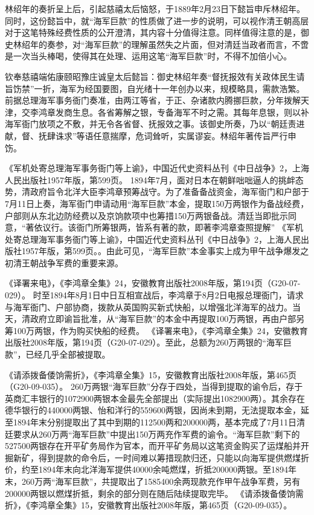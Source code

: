 \documentclass[12pt,UTF8]{ctexbook}
\begin{document}
林绍年的奏折呈上后，引起慈禧太后恼怒，于1889年2月23日下懿旨申斥林绍年。同时，这份懿旨中，就“海军巨款”的性质做了进一步的说明，可以视作清王朝高层对于这笔特殊经费性质的公开澄清，其内容十分值得注意。同样值得注意的是，御史林绍年的奏参，对“海军巨款”的理解虽然失之片面，但对清廷当政者而言，不啻是一次当头棒喝，使得其在处理、运用这笔“海军巨款”时，不得不加倍小心。

钦奉慈禧端佑康颐昭豫庄诚皇太后懿旨：御史林绍年奏“督抚报效有关政体民生请旨饬禁”一折，海军为经国要图，自光绪十一年创办以来，规模略具，需款浩繁。前据总理海军事务衙门奏准，由两江等省，于正、杂诸款内腾挪巨款，分年拨解天津，交李鸿章发商生息。各省筹解之银，专备海军不时之需。其每年息银，则以补海军衙门放项之不敷，并无令各省督、抚报效之事。该御史所奏，乃以“朝廷责进献，督、抚肆诛求”等语任意揣摩，危词耸听，实属谬妄。林绍年著传旨严行申饬。

《军机处寄总理海军事务衙门等上谕》，中国近代史资料丛刊《中日战争》2，上海人民出版社1957年版，第599页。
1894年7月，面对日本在朝鲜咄咄逼人的挑衅态势，清政府旨令北洋大臣李鸿章预筹战守。为了准备备战资金，海军衙门和户部于7月11日上奏，海军衙门申请动用“海军巨款”本金，提取150万两银作为备战经费，户部则从东北边防经费以及京饷款项中也筹措150万两银备战。清廷当即批示同意，“著依议行。该衙门所筹银两，皆系有著的款，即著李鸿章查照提解” 《军机处寄总理海军事务衙门等上谕》，中国近代史资料丛刊《中日战争》2，上海人民出版社1957年版，第599页。。由此可见，“海军巨款”本金事实上成为甲午战争爆发之初清王朝战争军费的重要来源。

《译署来电》，《李鸿章全集》24，安徽教育出版社2008年版，第194页（G20-07-029）。
时至1894年8月1日中日互相宣战后，李鸿章于8月2日电报总理衙门，请求与海军衙门、户部协商，拨款从英国购买新式快船，以增强北洋海军的战力。当天，清政府立即谕旨批准，从“海军巨款”的本金中再提取100万两银，再由户部另筹100万两银，作为购买快船的经费。 《译署来电》，《李鸿章全集》24，安徽教育出版社2008年版，第194页（G20-07-029）。至此，总额为260万两银的“海军巨款”，已经几乎全部被提取。

《请添拨备倭饷需折》，《李鸿章全集》15，安徽教育出版社2008年版，第465页（G20-09-035）。
260万两银“海军巨款”分存于四处，当得到提取的谕令后，存于英商汇丰银行的1072900两银本金最先全部提出（实际提出1082900两）。其余存在德华银行的440000两银、怡和洋行的559600两银，因尚未到期，无法提取本金，延至1894年末分别提取出了其中到期的112500两和200000两，基本完成了7月11日清廷要求从260万两“海军巨款”中提出150万两充作军费的谕令。“海军巨款”剩下的527500两银存在开平矿务局作为官本，而开平矿务局以这笔资金购买了运煤船并开掘新矿，得到提款的命令后，一时间难以筹措现款归还，只能以向海军提供燃煤折价，约至1894年末向北洋海军提供40000余吨燃煤，折抵200000两银。至1894年末，260万两“海军巨款”，共提取出了1585400余两现款充作甲午战争军费，另有200000两银以燃煤折抵，剩余的部分则在随后陆续提取完毕。 《请添拨备倭饷需折》，《李鸿章全集》15，安徽教育出版社2008年版，第465页（G20-09-035）。
\end{document}
